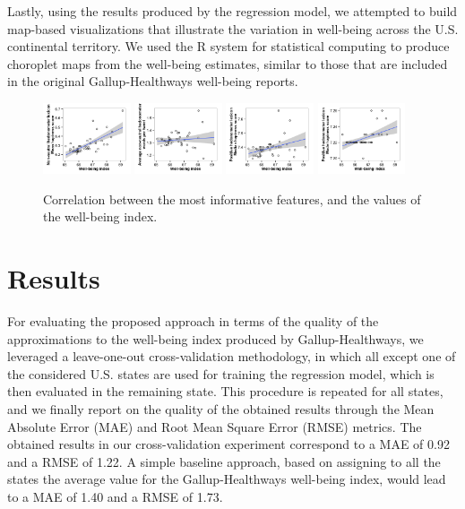 \documentclass{acm_proc_article-sp}
\begin{document}
Lastly, using the results produced by the regression model, we attempted to build map-based visualizations that illustrate the variation in well-being across the U.S. continental territory. We used the R system for statistical computing to produce choroplet maps from the well-being estimates, similar to those that are included in the original Gallup-Healthways well-being reports.

\begin{figure}[b!]
\centering
\includegraphics[width=0.23\textwidth]{scatter_1}
\includegraphics[width=0.23\textwidth]{scatter_2}
\includegraphics[width=0.23\textwidth]{scatter_3}
\includegraphics[width=0.23\textwidth]{scatter_4}
\caption{Correlation between the most informative features, and the values of the well-being index.}
\label{f2}
\end{figure}

\section{Results}

For evaluating the proposed approach in terms of the quality of the approximations to the well-being index produced by Gallup-Healthways, we leveraged a leave-one-out cross-validation methodology, in which all except one of the considered U.S. states are used for training the regression model, which is then evaluated in the remaining state. This procedure is repeated for all states, and we finally report on the quality of the obtained results through the Mean Absolute Error (MAE) and Root Mean Square Error (RMSE) metrics. The obtained results in our cross-validation experiment correspond to a MAE of 0.92 and a RMSE of 1.22. A simple baseline approach, based on assigning to all the states the average value for the Gallup-Healthways well-being index, would lead to a MAE of 1.40 and a RMSE of 1.73.
\end{document}
